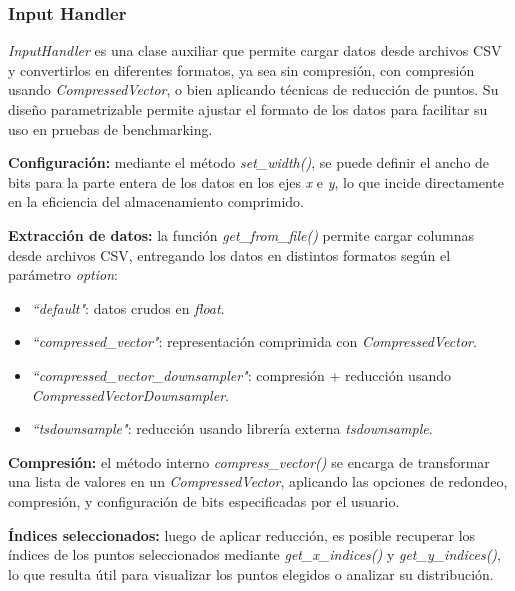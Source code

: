\subsubsection{Input Handler}

\textit{InputHandler} es una clase auxiliar que permite cargar datos desde archivos CSV y convertirlos en diferentes formatos, ya sea sin compresión, con compresión usando \textit{CompressedVector}, o bien aplicando técnicas de reducción de puntos. Su diseño parametrizable permite ajustar el formato de los datos para facilitar su uso en pruebas de benchmarking.

\vspace{0.5em}
\textbf{Configuración:} mediante el método \textit{set\_width()}, se puede definir el ancho de bits para la parte entera de los datos en los ejes \textit{x} e \textit{y}, lo que incide directamente en la eficiencia del almacenamiento comprimido.

\vspace{0.5em}
\textbf{Extracción de datos:} la función \textit{get\_from\_file()} permite cargar columnas desde archivos CSV, entregando los datos en distintos formatos según el parámetro \textit{option}:
\begin{itemize}
    \item \textit{``default"}: datos crudos en \textit{float}.
    \item \textit{``compressed\_vector"}: representación comprimida con \textit{CompressedVector}.
    \item \textit{``compressed\_vector\_downsampler"}: compresión + reducción usando \textit{CompressedVectorDownsampler}.
    \item \textit{``tsdownsample"}: reducción usando librería externa \textit{tsdownsample}.
\end{itemize}

\vspace{0.5em}
\textbf{Compresión:} el método interno \textit{compress\_vector()} se encarga de transformar una lista de valores en un \textit{CompressedVector}, aplicando las opciones de redondeo, compresión, y configuración de bits especificadas por el usuario.

\vspace{0.5em}
\textbf{Índices seleccionados:} luego de aplicar reducción, es posible recuperar los índices de los puntos seleccionados mediante \textit{get\_x\_indices()} y \textit{get\_y\_indices()}, lo que resulta útil para visualizar los puntos elegidos o analizar su distribución.

